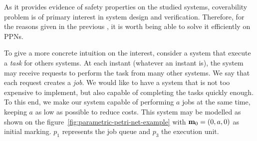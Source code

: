 
As it provides evidence of safety properties on the studied systems, coverability problem is of primary interest in system design and verification. Therefore, for the reasons given in the previous , it is worth being able to solve it efficiently on \acp{PPN}.

To give a more concrete intuition on the interest, consider a system that execute a \emph{task} for others systems.
At each instant (whatever an instant is), the system may receive requests to perform the task from many other systems. We say that each request creates a \emph{job}.
We would like to have a system that is not too expensive to implement, but also capable of completing the tasks quickly enough.
To this end, we make our system capable of performing $a$ jobs at the same time, keeping $a$ as low as possible to reduce costs.
This system may be modelled as shown on the figure~\ref{fig:parametric-petri-net-example} with $\mari = (0, \param[1], 0)$ as initial marking.
$p_1$ represents the job queue and $p_3$ the execution unit.

